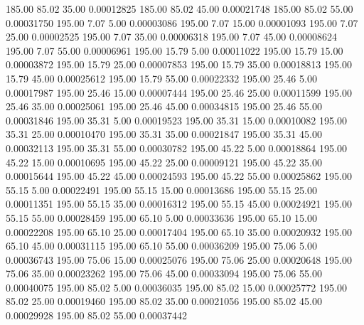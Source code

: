     185.00     85.02     35.00     0.00012825
    185.00     85.02     45.00     0.00021748
    185.00     85.02     55.00     0.00031750
    195.00      7.07      5.00     0.00003086
    195.00      7.07     15.00     0.00001093
    195.00      7.07     25.00     0.00002525
    195.00      7.07     35.00     0.00006318
    195.00      7.07     45.00     0.00008624
    195.00      7.07     55.00     0.00006961
    195.00     15.79      5.00     0.00011022
    195.00     15.79     15.00     0.00003872
    195.00     15.79     25.00     0.00007853
    195.00     15.79     35.00     0.00018813
    195.00     15.79     45.00     0.00025612
    195.00     15.79     55.00     0.00022332
    195.00     25.46      5.00     0.00017987
    195.00     25.46     15.00     0.00007444
    195.00     25.46     25.00     0.00011599
    195.00     25.46     35.00     0.00025061
    195.00     25.46     45.00     0.00034815
    195.00     25.46     55.00     0.00031846
    195.00     35.31      5.00     0.00019523
    195.00     35.31     15.00     0.00010082
    195.00     35.31     25.00     0.00010470
    195.00     35.31     35.00     0.00021847
    195.00     35.31     45.00     0.00032113
    195.00     35.31     55.00     0.00030782
    195.00     45.22      5.00     0.00018864
    195.00     45.22     15.00     0.00010695
    195.00     45.22     25.00     0.00009121
    195.00     45.22     35.00     0.00015644
    195.00     45.22     45.00     0.00024593
    195.00     45.22     55.00     0.00025862
    195.00     55.15      5.00     0.00022491
    195.00     55.15     15.00     0.00013686
    195.00     55.15     25.00     0.00011351
    195.00     55.15     35.00     0.00016312
    195.00     55.15     45.00     0.00024921
    195.00     55.15     55.00     0.00028459
    195.00     65.10      5.00     0.00033636
    195.00     65.10     15.00     0.00022208
    195.00     65.10     25.00     0.00017404
    195.00     65.10     35.00     0.00020932
    195.00     65.10     45.00     0.00031115
    195.00     65.10     55.00     0.00036209
    195.00     75.06      5.00     0.00036743
    195.00     75.06     15.00     0.00025076
    195.00     75.06     25.00     0.00020648
    195.00     75.06     35.00     0.00023262
    195.00     75.06     45.00     0.00033094
    195.00     75.06     55.00     0.00040075
    195.00     85.02      5.00     0.00036035
    195.00     85.02     15.00     0.00025772
    195.00     85.02     25.00     0.00019460
    195.00     85.02     35.00     0.00021056
    195.00     85.02     45.00     0.00029928
    195.00     85.02     55.00     0.00037442
